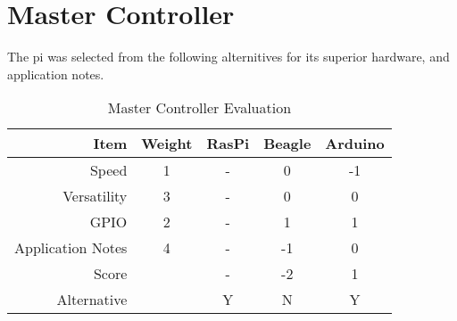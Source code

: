 \section{Master Controller}
The \gls{pi} was selected from the following alternitives for its superior hardware, and application notes.
\begin{table}[H]
\caption{Master Controller Evaluation}
	\label{table:MaCEval}
	\centering
\begin{tabular}{|r|c|c|c|c|}
\hline
Item              & Weight & RasPi & Beagle &Arduino \\ \hline
Speed             & 1      & -     & 0                                                     & -1                                                     \\ \hline
Versatility       & 3      & -     & 0                                                     & 0                                                      \\ \hline
GPIO              & 2      & -     & 1                                                     & 1                                                      \\ \hline
Application Notes & 4      & -     & -1                                                    & 0                                                      \\ \hline
Score             &        & -     & -2                                                    & 1                                                      \\ \hline
Alternative       &        & Y     & N                                                    & Y                                                    \\ \hline
\end{tabular}
\end{table}

